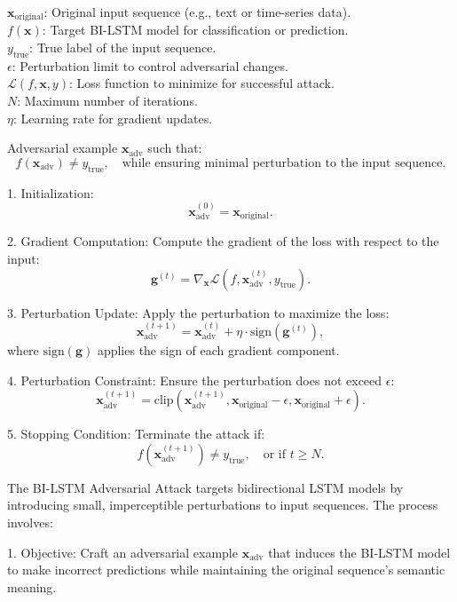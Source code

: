 $\mathbf{x}_{\text{original}}$: Original input sequence (e.g., text or time-series data). \\
$f(\mathbf{x})$: Target BI-LSTM model for classification or prediction. \\
$y_{\text{true}}$: True label of the input sequence. \\
$\epsilon$: Perturbation limit to control adversarial changes. \\
$\mathcal{L}(f, \mathbf{x}, y)$: Loss function to minimize for successful attack. \\
$N$: Maximum number of iterations. \\
$\eta$: Learning rate for gradient updates.

Adversarial example $\mathbf{x}_{\text{adv}}$ such that:
\[
f(\mathbf{x}_{\text{adv}}) \neq y_{\text{true}}, \quad \text{while ensuring minimal perturbation to the input sequence}.
\]

1. Initialization:
   \[
   \mathbf{x}_{\text{adv}}^{(0)} = \mathbf{x}_{\text{original}}.
   \]

2. Gradient Computation:
   Compute the gradient of the loss with respect to the input:
   \[
   \mathbf{g}^{(t)} = \nabla_{\mathbf{x}} \mathcal{L}(f, \mathbf{x}_{\text{adv}}^{(t)}, y_{\text{true}}).
   \]

3. Perturbation Update:
   Apply the perturbation to maximize the loss:
   \[
   \mathbf{x}_{\text{adv}}^{(t+1)} = \mathbf{x}_{\text{adv}}^{(t)} + \eta \cdot \text{sign}(\mathbf{g}^{(t)}),
   \]
   where $\text{sign}(\mathbf{g})$ applies the sign of each gradient component.

4. Perturbation Constraint:
   Ensure the perturbation does not exceed $\epsilon$:
   \[
   \mathbf{x}_{\text{adv}}^{(t+1)} = \text{clip}(\mathbf{x}_{\text{adv}}^{(t+1)}, \mathbf{x}_{\text{original}} - \epsilon, \mathbf{x}_{\text{original}} + \epsilon).
   \]

5. Stopping Condition:
   Terminate the attack if:
   \[
   f(\mathbf{x}_{\text{adv}}^{(t+1)}) \neq y_{\text{true}}, \quad \text{or if } t \geq N.
   \]

The BI-LSTM Adversarial Attack targets bidirectional LSTM models by introducing small, imperceptible perturbations to input sequences. The process involves:

1. Objective: Craft an adversarial example $\mathbf{x}_{\text{adv}}$ that induces the BI-LSTM model to make incorrect predictions while maintaining the original sequence's semantic meaning.

